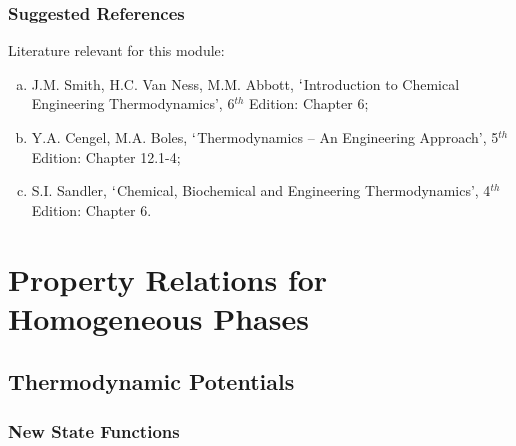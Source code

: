\documentclass[10pt,compress,handout,ignorenonframetext,unknownkeysallowed]{beamer}
\begin{document}
\begin{frame}
 \frametitle{Suggested References}
  Literature relevant for this module:
  \begin{enumerate}[(a)]
   \item\label{SVN_Book} J.M. Smith, H.C. Van Ness, M.M. Abbott, $\lq$Introduction to Chemical Engineering Thermodynamics', 6$^{th}$ Edition: Chapter 6;
   \item Y.A. Cengel, M.A. Boles, $\lq$Thermodynamics -- An Engineering Approach', 5$^{th}$ Edition: Chapter 12.1-4; 
   \item S.I. Sandler, $\lq$Chemical, Biochemical and Engineering Thermodynamics', 4$^{th}$ Edition: Chapter 6.
  \end{enumerate}
\end{frame}


\section{Property Relations for Homogeneous Phases}

\subsection{Thermodynamic Potentials} 


\begin{frame}
  \frametitle{New State Functions}

\end{frame}
\normalsize
\end{document}

